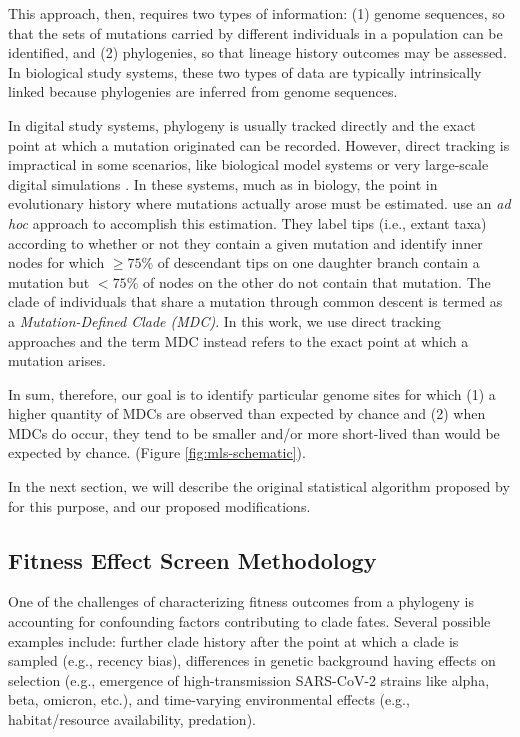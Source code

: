 This approach, then, requires two types of information: (1) genome sequences, so that the sets of mutations carried by different individuals in a population can be identified, and (2) phylogenies, so that lineage history outcomes may be assessed.
In biological study systems, these two types of data are typically intrinsically linked because phylogenies are inferred from genome sequences.

In digital study systems, phylogeny is usually tracked directly and the exact point at which a mutation originated can be recorded.
However, direct tracking is impractical in some scenarios, like biological model systems or very large-scale digital simulations \citep{ackley2023robust,moreno2024trackable}. In these systems, much as in biology, the point in evolutionary history where mutations actually arose must be estimated.
\citet{BonettiFranceschi2024phylogenetic} use an \textit{ad hoc} approach to accomplish this estimation. They label tips (i.e., extant taxa) according to whether or not they contain a given mutation and identify inner nodes for which $\geq75\%$ of descendant tips on one daughter branch contain a mutation but $<75\%$ of nodes on the other do not contain that mutation.
The clade of individuals that share a mutation through common descent is termed as a \textit{Mutation-Defined Clade (MDC)}.
In this work, we use direct tracking approaches and the term MDC instead refers to the exact point at which a mutation arises.

In sum, therefore, our goal is to identify particular genome sites for which (1) a higher quantity of MDCs are observed than expected by chance and (2) when MDCs do occur, they tend to be smaller and/or more short-lived than would be expected by chance.
(Figure \ref{fig:mls-schematic}).

In the next section, we will describe the original statistical algorithm proposed by \citet{BonettiFranceschi2024phylogenetic} for this purpose, and our proposed modifications.

\subsection{Fitness Effect Screen Methodology}

One of the challenges of characterizing fitness outcomes from a phylogeny is accounting for confounding factors contributing to clade fates.
Several possible examples include: further clade history after the point at which a clade is sampled (e.g., recency bias), differences in genetic background having effects on selection (e.g., emergence of high-transmission SARS-CoV-2 strains like alpha, beta, omicron, etc.), and time-varying environmental effects (e.g., habitat/resource availability, predation).

